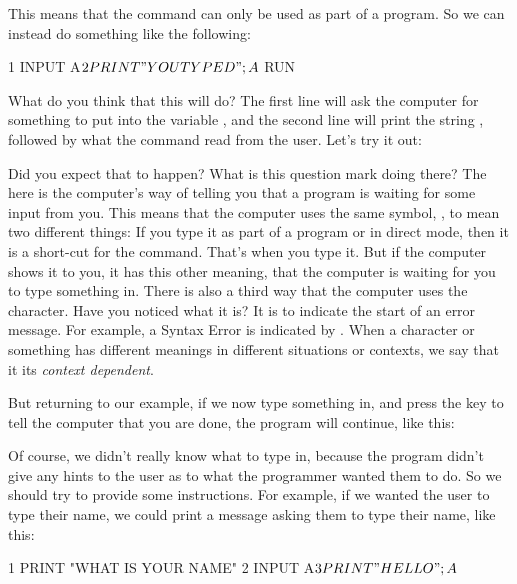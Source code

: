 
\needspace{4cm}
This means that the  command can only be used as part of a
program.  So we can instead do something like the following:

\begin{screenoutput}
1 INPUT A$
2 PRINT "YOU TYPED "; A$
RUN
\end{screenoutput}

\needspace{4cm}
What do you think that this will do?  The first line will ask the
computer for something to put into the variable , and the
second line will print the string , followed by
what the  command read from the user.  Let's try it out:


Did you expect that to happen? What is this question mark doing there?
The  here is the computer's way of telling you that a
program is waiting for some input from you.  This means that the
computer uses the same symbol, , to mean two different things:
If you type it as part of a program or in direct mode, then it is a
short-cut for the  command. That's when you type it. But if
the computer shows it to you, it has this other meaning, that the
computer is waiting for you to type something in. There is also a
third way that the computer uses the  character. Have you
noticed what it is?  It is to indicate the start of an error
message. For example, a Syntax Error is indicated by . When a character or something has different meanings in
different situations or contexts, we say that it its {\em context
  dependent}.

\needspace{4cm}
But returning to our example,  if we now type
something in, and press the  key to tell the
computer that you are done, the program will continue, like this:


\needspace{4cm}
Of course, we didn't really know what to type in, because the program
didn't give any hints to the user as to what the programmer wanted
them to do. So we should try to provide some instructions.  For
example, if we wanted the user to type their name, we could print a
message asking them to type their name, like this:

\begin{screenoutput}
  1 PRINT "WHAT IS YOUR NAME"
  2 INPUT A$
  3 PRINT "HELLO "; A$
\end{screenoutput}

